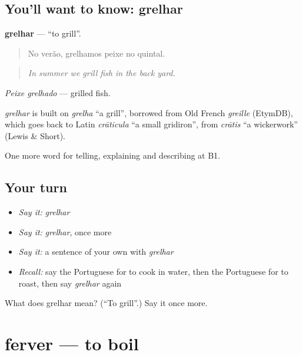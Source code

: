 \subsection*{You'll want to know: grelhar}
\textbf{grelhar} — \textquotedblleft{}to grill\textquotedblright{}.

\begin{quote}
No verão, grelhamos peixe no quintal.
\end{quote}

\begin{quote}
\emph{In summer we grill fish in the back yard.}
\end{quote}

\emph{Peixe grelhado} — grilled fish.

\begin{cousinweb}
\emph{grelhar} is built on \emph{grelha} \textquotedblleft{}a grill\textquotedblright{}, borrowed from Old French \emph{greille} (EtymDB), which goes back to Latin \emph{crāticula} \textquotedblleft{}a small gridiron\textquotedblright{}, from \emph{crātis} \textquotedblleft{}a wickerwork\textquotedblright{} (Lewis \& Short).
\end{cousinweb}

\begin{grammarlens}[title={What you've built}]
One more word for telling, explaining and describing at B1.
\end{grammarlens}

\subsection*{Your turn}
\begin{itemize}
\raggedright
  \item \emph{Say it:} \emph{grelhar}
  \item \emph{Say it:} \emph{grelhar}, once more
  \item \emph{Say it:} a sentence of your own with \emph{grelhar}
  \item \emph{Recall:} say the Portuguese for to cook in water, then the Portuguese for to roast, then say \emph{grelhar} again
\end{itemize}

\begin{tcolorbox}[breakable,colback=teal!4,colframe=teal!35!black,title={Before you move on}]
What does grelhar mean? (\textquotedblleft{}To grill\textquotedblright{}.) Say it once more.
\end{tcolorbox}
\section[ferver]{ferver — to boil}

